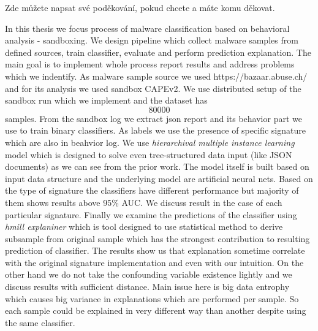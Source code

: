 \documentclass[11pt,twoside,a4paper]{book}
\begin{document}
	\translate

	{
		
		\newpage
	}

	\coverpagestarts

	\acknowledgements
	\noindent
	Zde můžete napsat své poděkování, pokud chcete a máte komu děkovat.


	\abstractpage

	In this thesis we focus process of malware classification based on behavioral analysis - sandboxing. We design pipeline which collect malware samples from defined sources, train classifier, evaluate and perform prediction explanation. The main goal is to implement whole process report results and address problems which we indentify. As malware sample source we used https://bazaar.abuse.ch/ and for its analysis we used sandbox CAPEv2. We use distributed setup of the sandbox run which we implement and the dataset has $$80000$$ samples. From the sandbox log we extract json report and its behavior part we use to train binary classifiers. As labels we use the presence of specific signature which are also in beahvior log. We use \emph{hierarchival multiple instance learning} model which is designed to solve even tree-structured data input (like JSON documents) as we can see from the prior work. The model itself is built based on input data structure and the underlying model are artificial neural nets. Based on the type of signature the classifiers have different performance but majority of them shows results above 95\% AUC. We discuss result in the case of each particular signature. Finally we examine the predictions of the classifier using \emph{hmill explaniner} which is tool designed to use statistical method to derive subsample from original sample which has the strongest contribution to resulting prediction of classifier. The results show us that explanation sometime correlate with the original signature implementation and even with our intuition. On the other hand we do not take the confounding variable existence lightly and we discuss results with sufficient distance. Main issue here is big data entrophy which causes big variance in explanations which are performed per sample. So each sample could be explained in very different way than another despite using the same classifier.

\end{document}
